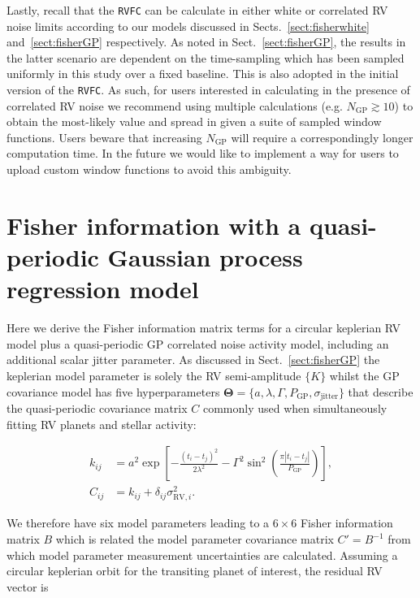 Lastly, recall that the
\texttt{RVFC} can be calculate \nrv{} in either white or correlated RV noise limits according to
our models discussed in Sects.~\ref{sect:fisherwhite} and~\ref{sect:fisherGP} respectively. As noted in
Sect.~\ref{sect:fisherGP}, the results in the latter scenario are dependent on the time-sampling which has
been sampled uniformly in this study over a fixed baseline. This is also adopted in the initial version of
the \texttt{RVFC}. As such, for users interested in calculating \nrv{} in the presence of correlated RV noise
we recommend using multiple calculations (e.g. $N_{\text{GP}} \gtrsim 10$) to obtain the most-likely value and
spread in \nrv{} given a suite of sampled window functions. Users beware that increasing $N_{\text{GP}}$ will
require a correspondingly longer computation time.  
In the future we would like to implement a way for users to upload custom window functions to avoid this
ambiguity.


\section{Fisher information with a quasi-periodic Gaussian process regression model} \label{app:fishergp}
Here we derive the Fisher information matrix terms for a circular keplerian RV model
plus a quasi-periodic GP correlated noise activity model, including an additional scalar jitter parameter.
As discussed in Sect.~\ref{sect:fisherGP}
the keplerian model parameter is solely the RV semi-amplitude $\{K \}$ whilst the GP covariance model has
five hyperparameters $\boldsymbol{\Theta} = \{a, \lambda, \Gamma, P_{\text{GP}}, \sigma_{\text{jitter}} \}$
that describe the quasi-periodic covariance matrix $C$ commonly used when simultaneously fitting RV planets
and stellar activity:

\begin{align}
  k_{ij} &= a^2 \exp{\left[ -\frac{(t_i-t_j)^2}{2 \lambda^2}
      -\Gamma^2 \sin^2{\left(\frac{\pi |t_i-t_j|}{P_{\text{GP}}} \right)} \right]}, \label{appeq:K1} \\
  C_{ij} &= k_{ij} + \delta_{ij} \sigma_{\text{RV},i}^2. \label{appeq:K2}
\end{align}
  
\noindent We therefore
have six model parameters leading to a $6 \times 6$ Fisher information matrix $B$ which is related
the model parameter covariance matrix $C'=B^{-1}$ from which model parameter measurement uncertainties
are calculated. Assuming a circular keplerian orbit for the transiting planet of interest, the residual
RV vector is

